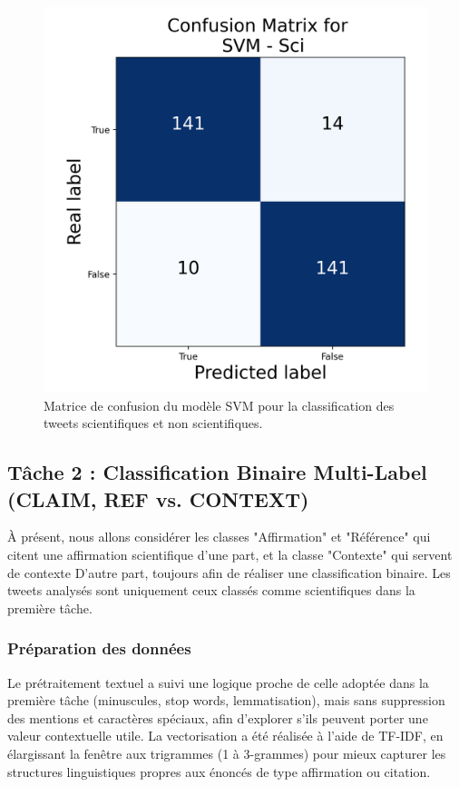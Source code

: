 \begin{figure}[H]
\begin{minipage}[b]{0.4\textwidth}
        \includegraphics[width=\textwidth]{images/confusion_1.json-SVM_Sci_confusion_matrix}
        \caption{Matrice de confusion du modèle SVM pour la classification des tweets scientifiques et non scientifiques.}
        \label{fig:confusion_1.json-SVM_sci_confusion_matrix}
    \end{minipage}
\end{figure}

\subsection{Tâche 2 : Classification Binaire Multi-Label ({CLAIM, REF} vs. {CONTEXT})}\label{subsec:modele-2:-claim-et-ref-vs-contexte}
À présent, nous allons considérer les classes "Affirmation" et "Référence" qui citent une affirmation scientifique d’une part, et la classe "Contexte" qui servent de contexte
D’autre part, toujours afin de réaliser une classification binaire.
Les tweets analysés sont uniquement ceux classés comme scientifiques dans la première tâche.

\subsubsection{Préparation des données}
Le prétraitement textuel a suivi une logique proche de celle adoptée dans la première tâche (minuscules, stop words, lemmatisation), mais sans suppression des mentions et caractères spéciaux, afin d’explorer s’ils peuvent porter une valeur contextuelle utile.
La vectorisation a été réalisée à l’aide de TF-IDF, en élargissant la fenêtre aux trigrammes (1 à 3-grammes) pour mieux capturer les structures linguistiques propres aux énoncés de type affirmation ou citation.

